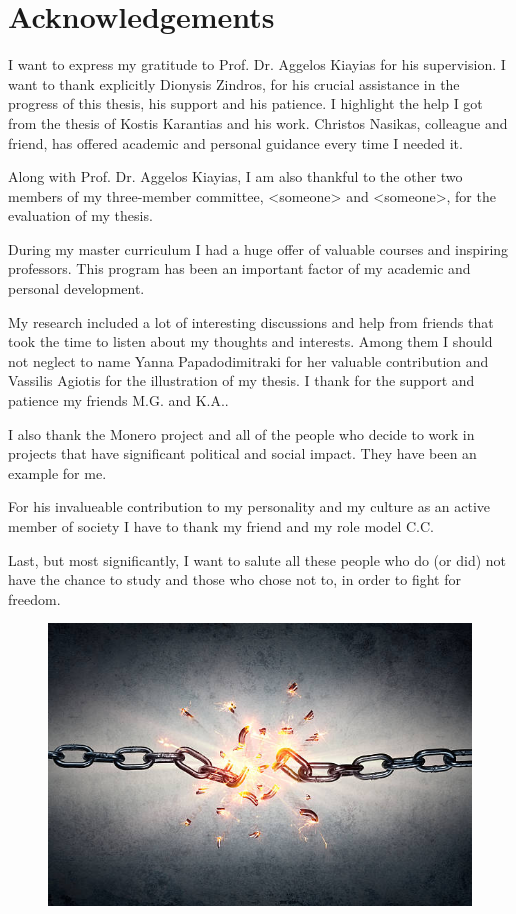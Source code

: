 \chapter*{Acknowledgements}
I want to express my gratitude to Prof. Dr. Aggelos Kiayias for his supervision. I want to thank explicitly Dionysis Zindros, for his crucial assistance in the progress of this thesis, his support and his patience. I highlight the help I got from the thesis of Kostis Karantias and his work. Christos Nasikas, colleague and friend, has offered academic and personal guidance every time I needed it.

Along with Prof. Dr. Aggelos Kiayias, I am also thankful to the other two members of my three-member committee, <someone> and <someone>, for the evaluation of my thesis.

During my master curriculum I had a huge offer of valuable courses and inspiring professors. This program has been an important factor of my academic and personal development.

My research included a lot of interesting discussions and help from friends that took the time to listen about my thoughts and interests. Among them I should not neglect to name Yanna Papadodimitraki for her valuable contribution and Vassilis Agiotis for the illustration of my thesis. I thank for the support and patience my friends M.G. and K.A..

I also thank the Monero project and all of the people who decide to work in projects that have significant political and social impact. They have been an example for me.

For his invalueable contribution to my personality and my culture as an active member of society I have to thank my friend and my role model C.C.

Last, but most significantly, I want to salute all these people who do (or did) not have the chance to study and those who chose not to, in order to fight for freedom.
\vspace{0.4cm}
\begin{figure}[H]
  \centering
  \includegraphics[scale=0.26,keepaspectratio]{Images/Acknowledgements/broken-chain.jpg}
\end{figure}
%
